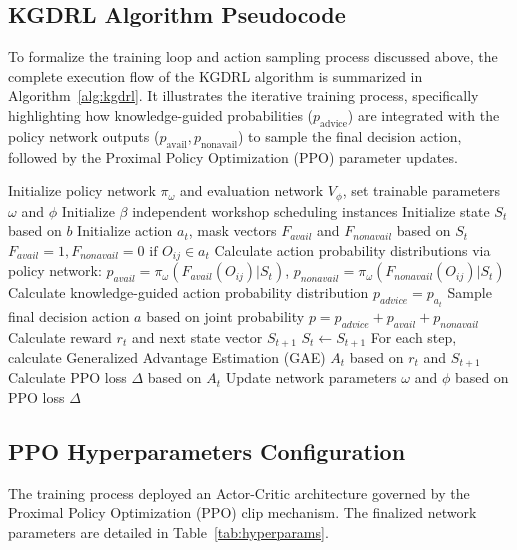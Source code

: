 \subsection{KGDRL Algorithm Pseudocode}

To formalize the training loop and action sampling process discussed above, the complete execution flow of the KGDRL algorithm is summarized in Algorithm~\ref{alg:kgdrl}. It illustrates the iterative training process, specifically highlighting how knowledge-guided probabilities ($p_{\text{advice}}$) are integrated with the policy network outputs ($p_{\text{avail}}, p_{\text{nonavail}}$) to sample the final decision action, followed by the Proximal Policy Optimization (PPO) parameter updates.

\begin{algorithm}[htbp]
\caption{Knowledge-Guided Deep Reinforcement Learning (KGDRL)}
\label{alg:kgdrl}
\begin{algorithmic}[1] %
\STATE Initialize policy network $\pi_{\omega}$ and evaluation network $V_{\phi}$, set trainable parameters $\omega$ and $\phi$
\STATE Initialize $\beta$ independent workshop scheduling instances
        \STATE Initialize state $S_t$ based on $b$
            \STATE Initialize action $a_t$, mask vectors $F_{avail}$ and $F_{nonavail}$ based on $S_t$
            \STATE $F_{avail} = 1, F_{nonavail} = 0 \text{ if } O_{ij} \in a_t$
            \STATE Calculate action probability distributions via policy network:
            \STATE \quad $p_{avail} = \pi_{\omega}(F_{avail}(O_{ij})|S_t)$, $p_{nonavail} = \pi_{\omega}(F_{nonavail}(O_{ij})|S_t)$
            \STATE Calculate knowledge-guided action probability distribution $p_{advice} = p_{a_t}$
            \STATE Sample final decision action $a$ based on joint probability $p = p_{advice} + p_{avail} + p_{nonavail}$
            \STATE Calculate reward $r_t$ and next state vector $S_{t+1}$
            \STATE $S_t \leftarrow S_{t+1}$
        \ENDWHILE
        \STATE For each step, calculate Generalized Advantage Estimation (GAE) $A_t$ based on $r_t$ and $S_{t+1}$
        \STATE Calculate PPO loss $\Delta$ based on $A_t$
        \STATE Update network parameters $\omega$ and $\phi$ based on PPO loss $\Delta$
    \ENDFOR
\ENDFOR
        \RETURN
\end{algorithmic}
\end{algorithm}

\subsection{PPO Hyperparameters Configuration}
The training process deployed an Actor-Critic architecture governed by the Proximal Policy Optimization (PPO) clip mechanism. The finalized network parameters are detailed in Table~\ref{tab:hyperparams}.

